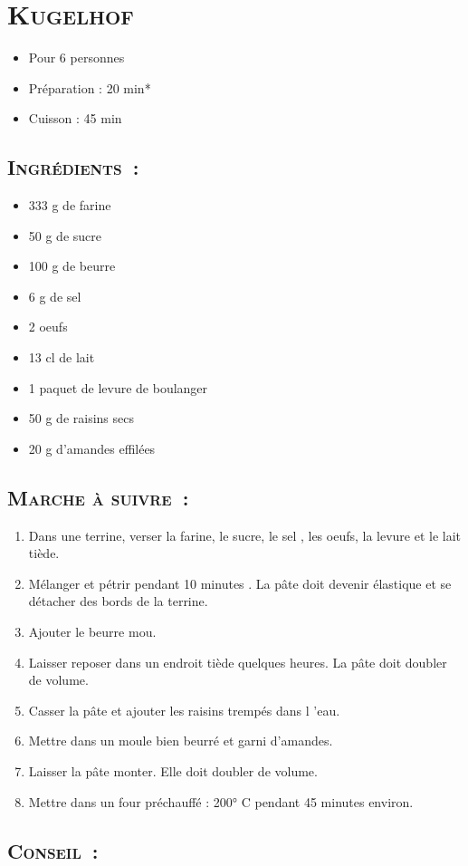 \section[\normalsize{Kugelhof}]{\LARGE{\textsc{Kugelhof}}}		%


\begin{itemize}
\item Pour 6 personnes
\item Préparation : 20 min*
\item Cuisson : 45 min
\end{itemize}

\subsection*{\textsc{Ingr\'edients~:}}

\begin{itemize}
\item 333 g de farine
\item 50 g de sucre
\item 100 g de beurre
\item 6 g de sel
\item 2 oeufs
\item 13 cl de lait
\item 1 paquet de levure de boulanger
\item 50 g  de raisins secs
\item 20 g d’amandes effil\'ees 
\end{itemize}


\subsection*{\textsc{Marche \`a suivre~:}}

\begin{enumerate}
\item Dans une terrine, verser la farine, le sucre, le sel , les oeufs, la levure et le lait ti\`ede. 

\item M\'elanger et p\'etrir pendant 10 minutes . La p\^ate doit devenir \'elastique et se d\'etacher des bords de la terrine. 

\item Ajouter le beurre mou.

\item Laisser reposer dans un endroit ti\`ede quelques heures. La p\^ate doit doubler de volume. 

\item Casser la p\^ate et ajouter les raisins tremp\'es dans l ’eau.

\item Mettre dans un moule bien beurr\'e et garni d’amandes.

\item Laisser la p\^ate monter. Elle doit doubler de volume.

\item Mettre dans un four pr\'echauff\'e : 200° C pendant 45 minutes environ.
\end{enumerate}
\subsection*{\textsc{Conseil~:}}

